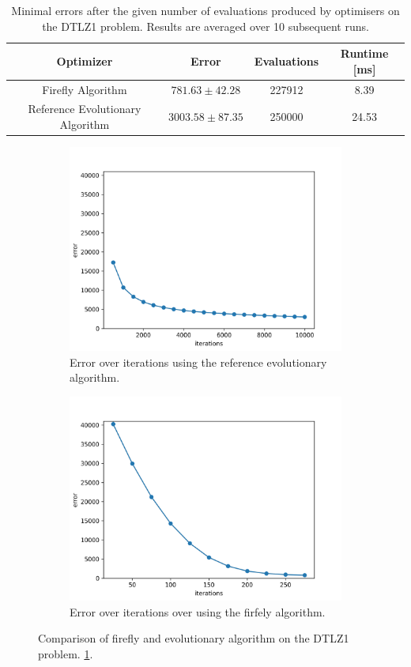 \begin{table}[H]
  \centering
   \begin{tabular}{|c c c c|}
     \hline
     \textbf{Optimizer} & \textbf{Error} & \textbf{Evaluations} & \textbf{Runtime [ms]} \\
     \hline
     Firefly Algorithm & $781.63 \pm 42.28$ & 227912 & 8.39 \\
     Reference Evolutionary Algorithm & $3003.58 \pm 87.35$ & 250000 & 24.53 \\
     \hline
  \end{tabular}
  \caption{Minimal errors after the given number of evaluations produced by optimisers on the DTLZ1 problem. Results are averaged over 10 subsequent runs.}
  \label{tab:firefly_vs_ea}
\end{table}

\begin{figure}
  \centering
  \begin{subfigure}{.5\textwidth}
    \centering
    \includegraphics[width=0.75\linewidth]{assets/reference.png}
    \caption{Error over iterations using the reference evolutionary algorithm.}
    \label{fig:sub1}
  \end{subfigure}%
  \begin{subfigure}{.5\textwidth}
    \centering
    \includegraphics[width=0.75\linewidth]{assets/firefly.png}
    \caption{Error over iterations over using the firfely algorithm.}
    \label{fig:sub2}
  \end{subfigure}
  \caption{Comparison of firefly and evolutionary algorithm on the DTLZ1 problem. \ref{tab:firefly_vs_ea}.}
  \label{fig:firefly_vs_ea}
\end{figure}

